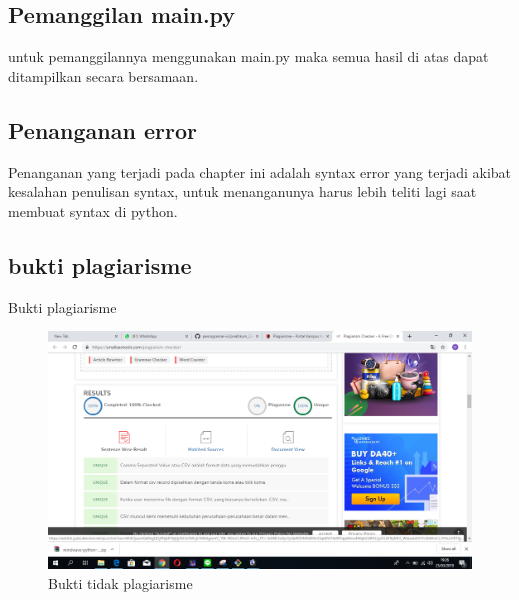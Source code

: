 \subsection{Pemanggilan main.py}
untuk pemanggilannya menggunakan main.py maka semua hasil di atas dapat ditampilkan secara bersamaan.

\subsection{Penanganan error}
Penanganan yang terjadi pada chapter ini adalah syntax error yang terjadi akibat kesalahan penulisan syntax, untuk menanganunya harus lebih teliti lagi saat membuat syntax di python.
\subsection{bukti plagiarisme}
Bukti plagiarisme
\begin{figure}[h]
\centering
\includegraphics[scale=0.1]{figures/6/Praktek/1174095/1174095.png}
\caption{Bukti tidak plagiarisme}
\label{fig:contoh}
\end{figure} 


